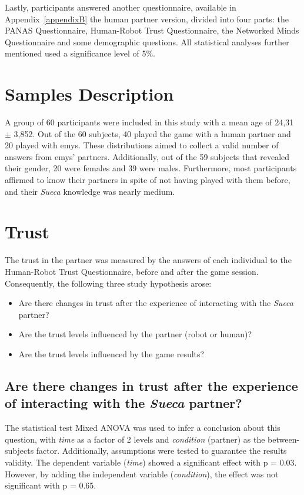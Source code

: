 Lastly, participants answered another questionnaire, available in Appendix~\ref{appendixB} the human partner version, divided into four parts: the PANAS Questionnaire, Human-Robot Trust Questionnaire, the Networked Minds Questionnaire \cite{Harms2004} and some demographic questions.
All statistical analyses further mentioned used a significance level of 5\%.

\section{Samples Description}
\label{sec:samples}
A group of 60 participants were included in this study with a mean age of 24,31 $\pm$ 3,852.
Out of the 60 subjects, 40 played the game with a human partner and 20 played with \ac{emys}.
These distributions aimed to collect a valid number of answers from \ac{emys}' partners.
Additionally, out of the 59 subjects that revealed their gender, 20 were females and 39 were males.
Furthermore, most participants affirmed to know their partners in spite of not having played with them before, and their \emph{Sueca} knowledge was nearly medium.

\section{Trust}
\label{sec:trust}
The trust in the partner was measured by the answers of each individual to the Human-Robot Trust Questionnaire, before and after the game session.
Consequently, the following three study hypothesis arose:
\begin{itemize}
\item Are there changes in trust after the experience of interacting with the \emph{Sueca} partner?
\item Are the trust levels influenced by the partner (robot or human)?
\item Are the trust levels influenced by the game results?
\end{itemize}


\subsection*{Are there changes in trust after the experience of interacting with the \emph{Sueca} partner?}
The statistical test Mixed ANOVA was used to infer a conclusion about this question, with \emph{time} as a factor of 2 levels and \emph{condition} (partner) as the between-subjects factor.
Additionally, assumptions were tested to guarantee the results validity.
The dependent variable (\emph{time}) showed a significant effect with p = 0.03.
However, by adding the independent variable (\emph{condition}), the effect was not significant with p = 0.65.

